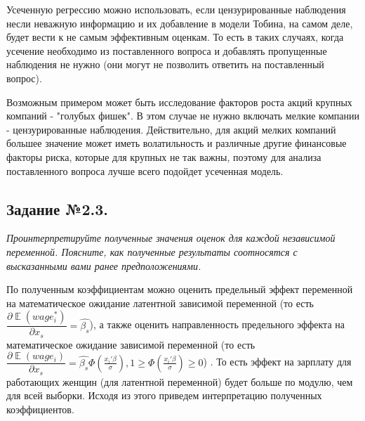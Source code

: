 \documentclass[a4paper,12pt]{article}
\DeclareMathOperator{\EX}{\mathbb{E}}%
\begin{document}
Усеченную регрессию можно использовать, если цензурированные наблюдения несли неважную информацию и их добавление в модели Тобина, на самом деле, будет вести к не самым эффективным оценкам. То есть в таких случаях, когда усечение необходимо из поставленного вопроса и добавлять пропущенные наблюдения не нужно (они могут не позволить ответить на поставленный вопрос). 

Возможным примером может быть исследование факторов роста акций крупных компаний  - "голубых фишек". В этом случае не нужно включать мелкие компании -  цензурированные наблюдения. Действительно, для акций мелких компаний большее значение может иметь волатильность и различные другие финансовые факторы риска, которые для крупных не так важны, поэтому для анализа поставленного вопроса лучше всего подойдет усеченная модель.


\subsection{Задание №2.3.}
\textit{Проинтерпретируйте полученные значения оценок для каждой независимой
переменной. Поясните, как полученные результаты соотносятся с высказанными вами
ранее предположениями.}

\vspace{0.2cm}

По полученным коэффициентам можно оценить предельный эффект переменной на математическое ожидание латентной зависимой переменной (то есть $\dfrac{\partial \EX (wage_i^*)}{\partial x_s}=\hat{\beta_s}$), а также оценить направленность предельного эффекта на математическое ожидание зависимой переменной (то есть $\dfrac{\partial \EX (wage_i)}{\partial x_s}=\hat{\beta_s}\Phi(\frac{x_i'\beta}{\sigma}), 1\geq \Phi(\frac{x_i'\beta}{\sigma})\geq0$) . То есть эффект на зарплату для работающих женщин (для латентной переменной) будет больше по модулю, чем для всей выборки. Исходя из этого приведем интерпретацию полученных коэффициентов.
\end{document}
